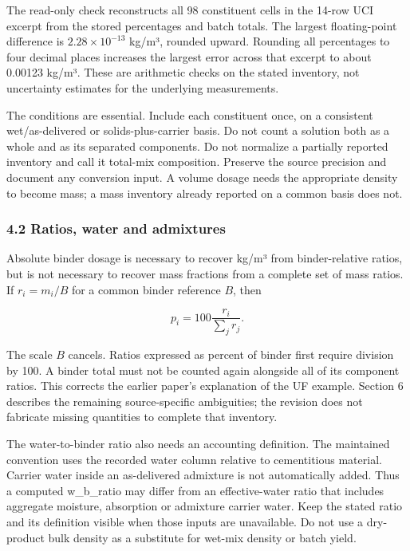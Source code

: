 \documentclass[
  american,
  11pt,
  letterpaper,
]{article}
\renewcommand{\texttt}[1]{{\ttfamily\fontsize{9.5}{11}\selectfont\hyphenchar\font=-1 #1}}
\begin{document}
The read-only check reconstructs all 98 constituent cells in the 14-row
UCI excerpt from the stored percentages and batch totals. The largest
floating-point difference is \(2.28\times10^{-13}\) kg/m³, rounded
upward. Rounding all percentages to four decimal places increases the
largest error across that excerpt to about 0.00123 kg/m³. These are
arithmetic checks on the stated inventory, not uncertainty estimates for
the underlying measurements.

The conditions are essential. Include each constituent once, on a
consistent wet/as-delivered or solids-plus-carrier basis. Do not count a
solution both as a whole and as its separated components. Do not
normalize a partially reported inventory and call it total-mix
composition. Preserve the source precision and document any conversion
input. A volume dosage needs the appropriate density to become mass; a
mass inventory already reported on a common basis does not.

\subsubsection{4.2 Ratios, water and
admixtures}\label{ratios-water-and-admixtures}

Absolute binder dosage is necessary to recover kg/m³ from
binder-relative ratios, but is not necessary to recover mass fractions
from a complete set of mass ratios. If \(r_i=m_i/B\) for a common binder
reference \(B\), then

\[p_i=100\frac{r_i}{\sum_j r_j}. \tag{2}\]

The scale \(B\) cancels. Ratios expressed as percent of binder first
require division by 100. A binder total must not be counted again
alongside all of its component ratios. This corrects the earlier paper's
explanation of the UF example. Section 6 describes the remaining
source-specific ambiguities; the revision does not fabricate missing
quantities to complete that inventory.

The water-to-binder ratio also needs an accounting definition. The
maintained convention uses the recorded water column relative to
cementitious material. Carrier water inside an as-delivered admixture is
not automatically added. Thus a computed \texttt{w\_b\_ratio} may differ
from an effective-water ratio that includes aggregate moisture,
absorption or admixture carrier water. Keep the stated ratio and its
definition visible when those inputs are unavailable. Do not use a
dry-product bulk density as a substitute for wet-mix density or batch
yield.
\end{document}

